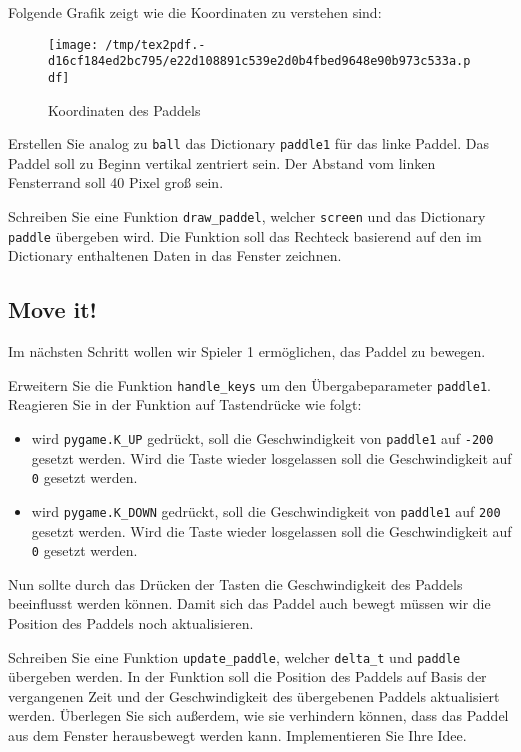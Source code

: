 \documentclass[
]{scrartcl}
\providecommand{\tightlist}{%
  \setlength{\itemsep}{0pt}\setlength{\parskip}{0pt}}
\begin{document}
Folgende Grafik zeigt wie die Koordinaten zu verstehen sind:

\begin{figure}
\centering
\texttt{[image: /tmp/tex2pdf.-d16cf184ed2bc795/e22d108891c539e2d0b4fbed9648e90b973c533a.pdf]}
\caption{Koordinaten des Paddels}
\end{figure}

 Erstellen Sie analog zu \texttt{ball} das Dictionary
\texttt{paddle1} für das linke Paddel. Das Paddel soll zu Beginn
vertikal zentriert sein. Der Abstand vom linken Fensterrand soll 40
Pixel groß sein.

 Schreiben Sie eine Funktion \texttt{draw\_paddel}, welcher
\texttt{screen} und das Dictionary \texttt{paddle} übergeben wird. Die
Funktion soll das Rechteck basierend auf den im Dictionary enthaltenen
Daten in das Fenster zeichnen.

\hypertarget{move-it}{%
\subsection{Move it!}\label{move-it}}

Im nächsten Schritt wollen wir Spieler 1 ermöglichen, das Paddel zu
bewegen.

 Erweitern Sie die Funktion \texttt{handle\_keys} um den
Übergabeparameter \texttt{paddle1}. Reagieren Sie in der Funktion auf
Tastendrücke wie folgt:

\begin{itemize}
\tightlist
\item
  wird \texttt{pygame.K\_UP} gedrückt, soll die Geschwindigkeit von
  \texttt{paddle1} auf \texttt{-200} gesetzt werden. Wird die Taste
  wieder losgelassen soll die Geschwindigkeit auf \texttt{0} gesetzt
  werden.
\item
  wird \texttt{pygame.K\_DOWN} gedrückt, soll die Geschwindigkeit von
  \texttt{paddle1} auf \texttt{200} gesetzt werden. Wird die Taste
  wieder losgelassen soll die Geschwindigkeit auf \texttt{0} gesetzt
  werden.
\end{itemize}

Nun sollte durch das Drücken der Tasten die Geschwindigkeit des Paddels
beeinflusst werden können. Damit sich das Paddel auch bewegt müssen wir
die Position des Paddels noch aktualisieren.

 Schreiben Sie eine Funktion \texttt{update\_paddle},
welcher \texttt{delta\_t} und \texttt{paddle} übergeben werden. In der
Funktion soll die Position des Paddels auf Basis der vergangenen Zeit
und der Geschwindigkeit des übergebenen Paddels aktualisiert werden.
Überlegen Sie sich außerdem, wie sie verhindern können, dass das Paddel
aus dem Fenster herausbewegt werden kann. Implementieren Sie Ihre Idee.
\end{document}
